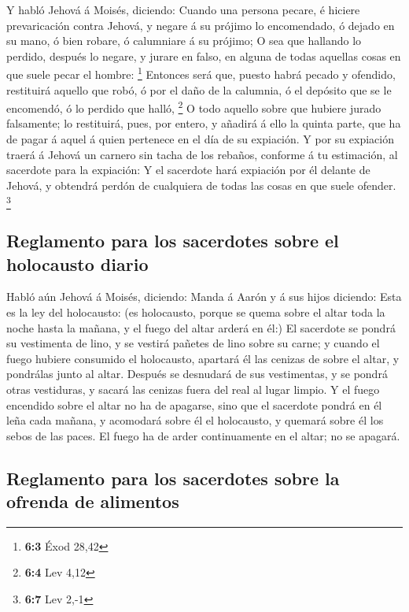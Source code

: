  Y habló Jehová á Moisés, diciendo:  Cuando
una persona pecare, é hiciere prevaricación contra Jehová, y negare á su
prójimo lo encomendado, ó dejado en su mano, ó bien robare, ó calumniare
á su prójimo;  O sea que hallando lo perdido, después lo
negare, y jurare en falso, en alguna de todas aquellas cosas en que
suele pecar el hombre: \footnote{\textbf{6:3} Éxod 28,42} 
Entonces será que, puesto habrá pecado y ofendido, restituirá aquello
que robó, ó por el daño de la calumnia, ó el depósito que se le
encomendó, ó lo perdido que halló, \footnote{\textbf{6:4} Lev 4,12}
 O todo aquello sobre que hubiere jurado falsamente; lo
restituirá, pues, por entero, y añadirá á ello la quinta parte, que ha
de pagar á aquel á quien pertenece en el día de su expiación.
 Y por su expiación traerá á Jehová un carnero sin tacha
de los rebaños, conforme á tu estimación, al sacerdote para la
expiación:  Y el sacerdote hará expiación por él delante
de Jehová, y obtendrá perdón de cualquiera de todas las cosas en que
suele ofender. \footnote{\textbf{6:7} Lev 2,-1}

\hypertarget{reglamento-para-los-sacerdotes-sobre-el-holocausto-diario}{%
\subsection{Reglamento para los sacerdotes sobre el holocausto
diario}\label{reglamento-para-los-sacerdotes-sobre-el-holocausto-diario}}

 Habló aún Jehová á Moisés, diciendo:  Manda
á Aarón y á sus hijos diciendo: Esta es la ley del holocausto: (es
holocausto, porque se quema sobre el altar toda la noche hasta la
mañana, y el fuego del altar arderá en él:)  El sacerdote
se pondrá su vestimenta de lino, y se vestirá pañetes de lino sobre su
carne; y cuando el fuego hubiere consumido el holocausto, apartará él
las cenizas de sobre el altar, y pondrálas junto al altar.
 Después se desnudará de sus vestimentas, y se pondrá
otras vestiduras, y sacará las cenizas fuera del real al lugar limpio.
 Y el fuego encendido sobre el altar no ha de apagarse,
sino que el sacerdote pondrá en él leña cada mañana, y acomodará sobre
él el holocausto, y quemará sobre él los sebos de las paces.
 El fuego ha de arder continuamente en el altar; no se
apagará.

\hypertarget{reglamento-para-los-sacerdotes-sobre-la-ofrenda-de-alimentos}{%
\subsection{Reglamento para los sacerdotes sobre la ofrenda de
alimentos}\label{reglamento-para-los-sacerdotes-sobre-la-ofrenda-de-alimentos}}

